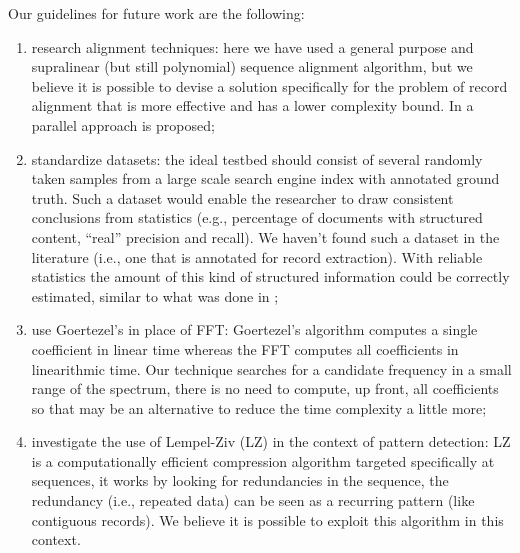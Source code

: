 \documentclass{vldb}
\begin{document}
Our guidelines for future work are the following:
\begin{enumerate}
  \item research alignment techniques: here we have used a general purpose and
  supralinear (but still polynomial) sequence alignment algorithm, but we
  believe it is possible to devise a solution specifically for the problem of
  record alignment that is more effective and has a lower complexity bound. In
  \cite{gfrerer2017parallel} a parallel approach is proposed;
  \item standardize datasets: the ideal testbed should consist of several
  randomly taken samples from a large scale search engine index with annotated
  ground truth.
  Such a dataset would enable the researcher to draw consistent conclusions
  from statistics (e.g., percentage of documents with structured content,
  ``real'' precision and recall). We haven't found such a dataset in the
  literature (i.e., one that is annotated for record extraction). With reliable
  statistics the amount of this kind of structured information could be
  correctly estimated, similar to what was done in \cite{webtables2008};
  \item use Goertezel's \cite{goertzel1958algorithm} in place of FFT:
  Goertezel's algorithm computes a single coefficient in linear time whereas the
  FFT computes all coefficients in linearithmic time. Our technique searches for a
  candidate frequency in a small range of the spectrum, there is no need to
  compute, up front, all coefficients so that may be an alternative to reduce
  the time complexity a little more;
  \item investigate the use of Lempel-Ziv\cite{ziv1977universal} (LZ) in the
  context of pattern detection: LZ is a computationally efficient compression
  algorithm targeted specifically at sequences, it works by looking for
  redundancies in the sequence, the redundancy (i.e., repeated data) can be seen
  as a recurring pattern (like contiguous records). We believe it is
  possible to exploit this algorithm in this context.
\end{enumerate}

 



\pagebreak
\end{document}
